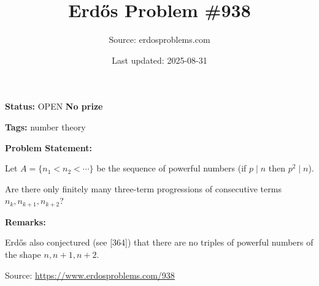 \documentclass{article}
\title{Erd\H{o}s Problem \#938}
\date{Last updated: 2025-08-31}
\author{Source: erdosproblems.com}
\begin{document}
\maketitle

\noindent\textbf{Status:} OPEN \quad \textbf{No prize}

\noindent\textbf{Tags:} number theory

\medskip
\noindent\textbf{Problem Statement:}

Let $A=\{n_1<n_2<\cdots\}$ be the sequence of powerful numbers (if $p\mid n$ then $p^2\mid n$).

Are there only finitely many three-term progressions of consecutive terms $n_k,n_{k+1},n_{k+2}$?

\bigskip
\noindent\textbf{Remarks:}

Erd\H{o}s also conjectured (see [364]) that there are no triples of powerful numbers of the shape $n,n+1,n+2$.

\bigskip
\noindent\small{Source: \url{https://www.erdosproblems.com/938}}
\end{document}
